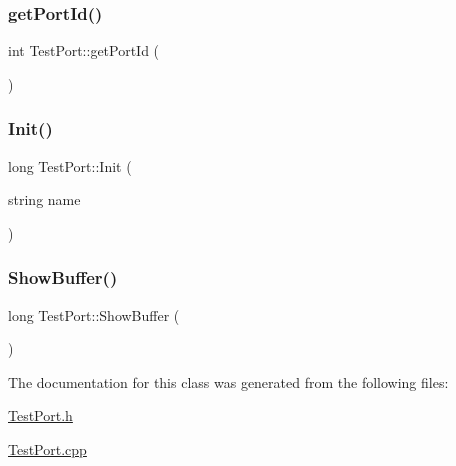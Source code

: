 \subsubsection{\texorpdfstring{get\+Port\+Id()}{getPortId()}}
{\footnotesize\ttfamily int Test\+Port\+::get\+Port\+Id (\begin{DoxyParamCaption}{ }\end{DoxyParamCaption})}

\mbox{\label{classTestPort_adbc256fed358ebb6bf3243ccd187170f}} 
\subsubsection{\texorpdfstring{Init()}{Init()}}
{\footnotesize\ttfamily long Test\+Port\+::\+Init (\begin{DoxyParamCaption}\item[{string}]{name }\end{DoxyParamCaption})\hspace{0.3cm}{\ttfamily [private]}}

\mbox{\label{classTestPort_acc9bf1db6c1ca7d9040591306100ab36}} 
\subsubsection{\texorpdfstring{Show\+Buffer()}{ShowBuffer()}}
{\footnotesize\ttfamily long Test\+Port\+::\+Show\+Buffer (\begin{DoxyParamCaption}{ }\end{DoxyParamCaption})}



The documentation for this class was generated from the following files\+:\begin{DoxyCompactItemize}
\item 
\hyperlink{TestPort_8h}{Test\+Port.\+h}\item 
\hyperlink{TestPort_8cpp}{Test\+Port.\+cpp}\end{DoxyCompactItemize}
